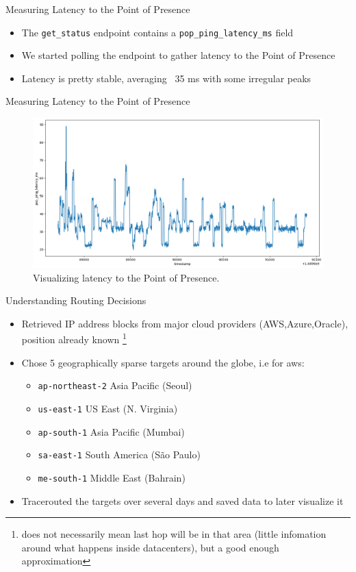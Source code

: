 \documentclass[NET,english,beameralt]{tumbeamer}
\begin{document}
\begin{frame}{Measuring Latency to the Point of Presence}
    \begin{itemize}
        \item The \texttt{get\_status} endpoint contains a  \texttt{pop\_ping\_latency\_ms} field
        \item We started polling the endpoint to gather latency to the Point of Presence
        \item Latency is pretty stable, averaging ~35 ms with some irregular peaks
    \end{itemize}
\end{frame}

\begin{frame}{Measuring Latency to the Point of Presence}
    \begin{figure}
        \centering
        \includegraphics[width=1\columnwidth]{pics/latency.png}
        \caption{Visualizing latency to the Point of Presence.}
    \end{figure}
\end{frame}

\begin{frame}{Understanding Routing Decisions}
	\begin{itemize}
		\item Retrieved IP address blocks from major cloud providers (AWS,Azure,Oracle), position already known
			\footnote{does not necessarily mean last hop will be in that area (little infomation around what happens inside datacenters), 
                        but a good enough approximation}
		\item Chose 5 geographically sparse targets around the globe, i.e for aws:
            \begin{itemize}
                \item \texttt{ap-northeast-2} Asia Pacific (Seoul)
                \item \texttt{us-east-1} US East (N. Virginia)
                \item \texttt{ap-south-1} Asia Pacific (Mumbai)
                \item \texttt{sa-east-1} South America (São Paulo)
                \item \texttt{me-south-1} Middle East (Bahrain)
            \end{itemize}
    	\item Tracerouted the targets over several days and saved data to later visualize it
	\end{itemize}
\end{frame}
\end{document}

